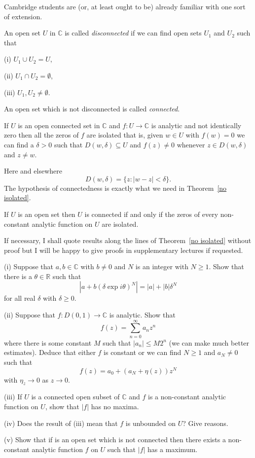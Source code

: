Cambridge students are 
(or, at least ought to be)
already familiar with one sort of extension.
\begin{definition} An open set $U$ in ${\mathbb C}$
is called \emph{disconnected}
if we can find open sets $U_{1}$ and $U_{2}$ such that

(i) $U_{1}\cup U_{2}=U$,

(ii) $U_{1}\cap U_{2}=\emptyset$,

(iii) $U_{1},U_{2}\neq\emptyset$.

An open set which is not disconnected is called 
\emph{connected}.
\end{definition}
\begin{theorem}\label{no isolated}
If $U$ is an open connected set
in ${\mathbb C}$ and $f:U\rightarrow {\mathbb C}$
is analytic and not identically zero then
all the zeros of $f$ are isolated that is,
given $w\in U$ with $f(w)=0$ we can find a $\delta>0$
such that $D(w,\delta)\subseteq U$ and $f(z)\neq 0$
whenever $z\in D(w,\delta)$ and $z\neq w$.
\end{theorem}
Here and elsewhere
\[D(w,\delta)=\{z:|w-z|<\delta\}.\]
The hypothesis of connectedness is exactly what we need
in Theorem~\ref{no isolated}.
\begin{theorem} If $U$ is an open set then
$U$ is connected if and only if the zeros of
every non-constant analytic function on $U$
are isolated.
\end{theorem}
If necessary, I shall quote results along the lines of
Theorem~\ref{no isolated} without proof but I will be
happy to give proofs in supplementary lectures if requested.
\begin{exercise}\label{Maximum principle} 
(i) Suppose that $a,b\in{\mathbb C}$ 
with $b\neq 0$ and $N$ is an integer with $N\geq 1$.
Show that there is a $\theta\in{\mathbb R}$ such that
\[|a+b(\delta\exp i\theta)^{N}|=|a|+|b|\delta^{N}\]
for all real $\delta$ with $\delta\geq 0$.

(ii) Suppose that 
$f:D(0,1)\rightarrow{\mathbb C}$ is analytic.
Show that
\[f(z)=\sum_{n=0}^{\infty}a_{n}z^{n}\]
where there is some constant $M$ such that $|a_{n}|\leq M2^{n}$
(we can make much better estimates). Deduce that
either $f$ is constant or we can find $N\geq 1$
and $a_{N}\neq 0$ such that
\[f(z)=a_{0}+(a_{N}+\eta(z))z^{N}\]
with $\eta_{z}\rightarrow 0$ as $z\rightarrow 0$.

(iii) If $U$ is a connected open subset of ${\mathbb C}$
and $f$ is a non-constant analytic function on $U$, show
that $|f|$
has no maxima. 

(iv) Does the result of (iii) mean that $f$ is unbounded on $U$?
Give reasons.

(v) Show that if is an open set which is not connected then
there exists a non-constant analytic function $f$ on $U$
such that $|f|$ has a maximum. 
\end{exercise} 
